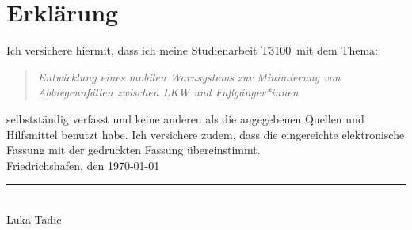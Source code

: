 \documentclass[a4paper, 12pt]{article} %
\newcommand{\titel}{Entwicklung eines mobilen Warnsystems zur Minimierung von Abbiegeunfällen zwischen LKW und Fußgänger*innen}
\newcommand{\arbeit}{Studienarbeit T3100}
\newcommand{\autor}{Luka Tadic}
\begin{document}
\begin{titlepage}
\end{titlepage}

\clearpage

\pagestyle{scrheadings}  %
\hypersetup{pageanchor=true}



\section*{Erklärung}
\begin{spacing}{1.8}  %
    \fontsize{14pt}{15pt}\selectfont  %

Ich versichere hiermit, dass ich meine \arbeit\ mit dem Thema:

\begin{quote}
    \textit{\titel}
\end{quote}

selbstständig verfasst und keine anderen als die angegebenen Quellen und Hilfsmittel benutzt habe.  
Ich versichere zudem, dass die eingereichte elektronische Fassung mit der gedruckten Fassung übereinstimmt.\\[6ex]

Friedrichshafen, den \today \\[1ex]
\rule[-0.2cm]{5cm}{0.5pt} \\  
\autor \\[10ex]

\rmfamily

\end{spacing}

\clearpage
\end{document}
